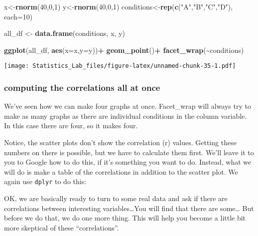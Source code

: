 \documentclass[
]{book}
\newenvironment{Shaded}{\begin{snugshade}}{\end{snugshade}}
\newcommand{\AttributeTok}[1]{\textcolor[rgb]{0.13,0.29,0.53}{#1}}
\newcommand{\DecValTok}[1]{\textcolor[rgb]{0.00,0.00,0.81}{#1}}
\newcommand{\FunctionTok}[1]{\textcolor[rgb]{0.13,0.29,0.53}{\textbf{#1}}}
\newcommand{\NormalTok}[1]{#1}
\newcommand{\OtherTok}[1]{\textcolor[rgb]{0.56,0.35,0.01}{#1}}
\newcommand{\SpecialCharTok}[1]{\textcolor[rgb]{0.81,0.36,0.00}{\textbf{#1}}}
\newcommand{\StringTok}[1]{\textcolor[rgb]{0.31,0.60,0.02}{#1}}
\begin{document}
\begin{Shaded}
\begin{Highlighting}[]
\NormalTok{x}\OtherTok{\textless{}{-}}\FunctionTok{rnorm}\NormalTok{(}\DecValTok{40}\NormalTok{,}\DecValTok{0}\NormalTok{,}\DecValTok{1}\NormalTok{)}
\NormalTok{y}\OtherTok{\textless{}{-}}\FunctionTok{rnorm}\NormalTok{(}\DecValTok{40}\NormalTok{,}\DecValTok{0}\NormalTok{,}\DecValTok{1}\NormalTok{)}
\NormalTok{conditions}\OtherTok{\textless{}{-}}\FunctionTok{rep}\NormalTok{(}\FunctionTok{c}\NormalTok{(}\StringTok{"A"}\NormalTok{,}\StringTok{"B"}\NormalTok{,}\StringTok{"C"}\NormalTok{,}\StringTok{"D"}\NormalTok{), }\AttributeTok{each=}\DecValTok{10}\NormalTok{)}

\NormalTok{all\_df }\OtherTok{\textless{}{-}} \FunctionTok{data.frame}\NormalTok{(conditions, x, y)}

\FunctionTok{ggplot}\NormalTok{(all\_df, }\FunctionTok{aes}\NormalTok{(}\AttributeTok{x=}\NormalTok{x,}\AttributeTok{y=}\NormalTok{y))}\SpecialCharTok{+}
  \FunctionTok{geom\_point}\NormalTok{()}\SpecialCharTok{+}
  \FunctionTok{facet\_wrap}\NormalTok{(}\SpecialCharTok{\textasciitilde{}}\NormalTok{conditions)}
\end{Highlighting}
\end{Shaded}

\texttt{[image: Statistics\_Lab\_files/figure-latex/unnamed-chunk-35-1.pdf]}

\hypertarget{computing-the-correlations-all-at-once}{%
\subsubsection{computing the correlations all at once}\label{computing-the-correlations-all-at-once}}

We've seen how we can make four graphs at once. Facet\_wrap will always try to make as many graphs as there are individual conditions in the column variable. In this case there are four, so it makes four.

Notice, the scatter plots don't show the correlation (r) values. Getting these numbers on there is possible, but we have to calculate them first. We'll leave it to you to Google how to do this, if it's something you want to do. Instead, what we will do is make a table of the correlations in addition to the scatter plot. We again use \texttt{dplyr} to do this:

OK, we are basically ready to turn to some real data and ask if there are correlations between interesting variables\ldots You will find that there are some\ldots{} But before we do that, we do one more thing. This will help you become a little bit more skeptical of these ``correlations''.
\end{document}
